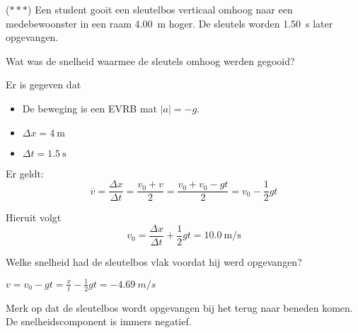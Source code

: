 \documentclass{ximera}
\begin{document}
\begin{exercise}
    ($\ast\ast\ast$) Een student gooit een sleutelbos verticaal omhoog naar een medebewoonster in een raam \SI{4,00}{m} hoger. De sleutels worden \SI{1,50}{s} later opgevangen.
    \begin{question} 
        Wat was de snelheid waarmee de sleutels omhoog werden gegooid?  
        \begin{oplossing} 
            Er is gegeven dat 
            \begin{itemize}
                \item De beweging is een EVRB mat \(|a| = -g\). 
                \item \(\Delta x = \SI{4}{\meter}\)
                \item \(\Delta t = \SI{1,5}{\second}\)
            \end{itemize}
            
            Er geldt: 
            \[
            \overline{v} = \frac{\Delta x}{\Delta t} = \frac{v_0 + v}{2} = \frac{v_0 + v_0 - gt}{2} = v_0 - \frac{1}{2}gt
            \]

            Hieruit volgt 
            \[
            v_0 = \frac{\Delta x}{\Delta t} + \frac{1}{2}gt = \SI{10,0}{\meter\per\second}
            \]
        \end{oplossing} 
    \end{question}
    \begin{question} Welke snelheid had de sleutelbos vlak voordat hij werd opgevangen? 
        \begin{oplossing} 

        $v=v_0-gt=\frac{x}{t}-\frac{1}{2}gt=\SI{-4,69}{m/s}$

        Merk op dat de sleutelbos wordt opgevangen bij het terug naar beneden komen. De snelheidscomponent is immers negatief.
        \end{oplossing} 
    \end{question}
\end{exercise}
\end{document}

